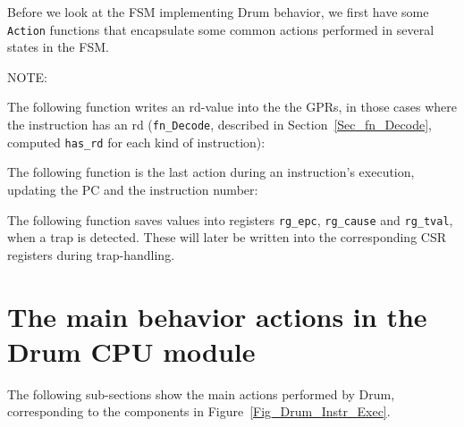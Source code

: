 \label{Sec_Drum_FSM_help_fns}

Before we look at the FSM implementing Drum behavior, we first have
some \verb|Action| functions that encapsulate some common actions
performed in several states in the FSM.

\vspace{2ex}

NOTE: 

\vspace{1ex}

The following function writes an rd-value into the the GPRs, in those
cases where the instruction has an rd (\verb|fn_Decode|, described in
Section~\ref{Sec_fn_Decode}, computed \verb|has_rd| for each kind of
instruction):


The following function is the last action during an instruction's
execution, updating the PC and the instruction number:


The following function saves values into registers \verb|rg_epc|,
\verb|rg_cause| and \verb|rg_tval|, when a trap is detected.  These
will later be written into the corresponding CSR registers during
trap-handling.



\section{The main behavior actions in the Drum CPU module}

\label{Sec_Drum_actions}


The following sub-sections show the main actions performed by Drum,
corresponding to the components in Figure~\ref{Fig_Drum_Instr_Exec}.

\vspace{2ex}


